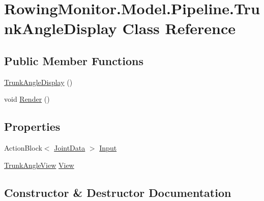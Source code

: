 \hypertarget{class_rowing_monitor_1_1_model_1_1_pipeline_1_1_trunk_angle_display}{}\section{Rowing\+Monitor.\+Model.\+Pipeline.\+Trunk\+Angle\+Display Class Reference}
\label{class_rowing_monitor_1_1_model_1_1_pipeline_1_1_trunk_angle_display}
\subsection*{Public Member Functions}
\begin{DoxyCompactItemize}
\item 
\hyperlink{class_rowing_monitor_1_1_model_1_1_pipeline_1_1_trunk_angle_display_aa821fa5b4473ec7cc3ce2947fb9b4b73}{Trunk\+Angle\+Display} ()
\item 
void \hyperlink{class_rowing_monitor_1_1_model_1_1_pipeline_1_1_trunk_angle_display_a3f82a22f8d195e8285ec1008514b8a3a}{Render} ()
\end{DoxyCompactItemize}
\subsection*{Properties}
\begin{DoxyCompactItemize}
\item 
Action\+Block$<$ \hyperlink{struct_rowing_monitor_1_1_model_1_1_util_1_1_joint_data}{Joint\+Data} $>$ \hyperlink{class_rowing_monitor_1_1_model_1_1_pipeline_1_1_trunk_angle_display_a2bbac9839cfa5977f133be79c3c47754}{Input}
\item 
\hyperlink{class_rowing_monitor_1_1_view_1_1_trunk_angle_view}{Trunk\+Angle\+View} \hyperlink{class_rowing_monitor_1_1_model_1_1_pipeline_1_1_trunk_angle_display_ac0578beabcf4ec767137c3e7b9d50493}{View}
\end{DoxyCompactItemize}


\subsection{Constructor \& Destructor Documentation}
\mbox{\label{class_rowing_monitor_1_1_model_1_1_pipeline_1_1_trunk_angle_display_aa821fa5b4473ec7cc3ce2947fb9b4b73}} 
